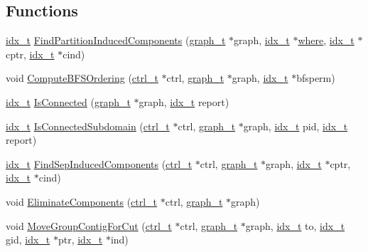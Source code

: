 \subsection*{Functions}
\begin{DoxyCompactItemize}
\item 
\hyperlink{a00876_aaa5262be3e700770163401acb0150f52}{idx\+\_\+t} \hyperlink{a00188_a9fe01ab71e17df2db81db0ce0376cc96}{Find\+Partition\+Induced\+Components} (\hyperlink{a00734}{graph\+\_\+t} $\ast$graph, \hyperlink{a00876_aaa5262be3e700770163401acb0150f52}{idx\+\_\+t} $\ast$\hyperlink{a00879_a7a355801f721e9d8d4ae03590a3a56b0}{where}, \hyperlink{a00876_aaa5262be3e700770163401acb0150f52}{idx\+\_\+t} $\ast$cptr, \hyperlink{a00876_aaa5262be3e700770163401acb0150f52}{idx\+\_\+t} $\ast$cind)
\item 
void \hyperlink{a00188_a5a549d240e59b4a6dedd991e0c4e82c1}{Compute\+B\+F\+S\+Ordering} (\hyperlink{a00742}{ctrl\+\_\+t} $\ast$ctrl, \hyperlink{a00734}{graph\+\_\+t} $\ast$graph, \hyperlink{a00876_aaa5262be3e700770163401acb0150f52}{idx\+\_\+t} $\ast$bfsperm)
\item 
\hyperlink{a00876_aaa5262be3e700770163401acb0150f52}{idx\+\_\+t} \hyperlink{a00188_a06638e74c8e49f9fb9881b960f8c4f05}{Is\+Connected} (\hyperlink{a00734}{graph\+\_\+t} $\ast$graph, \hyperlink{a00876_aaa5262be3e700770163401acb0150f52}{idx\+\_\+t} report)
\item 
\hyperlink{a00876_aaa5262be3e700770163401acb0150f52}{idx\+\_\+t} \hyperlink{a00188_aa6e8cf71404dada70fbba7451df92acb}{Is\+Connected\+Subdomain} (\hyperlink{a00742}{ctrl\+\_\+t} $\ast$ctrl, \hyperlink{a00734}{graph\+\_\+t} $\ast$graph, \hyperlink{a00876_aaa5262be3e700770163401acb0150f52}{idx\+\_\+t} pid, \hyperlink{a00876_aaa5262be3e700770163401acb0150f52}{idx\+\_\+t} report)
\item 
\hyperlink{a00876_aaa5262be3e700770163401acb0150f52}{idx\+\_\+t} \hyperlink{a00188_a47a30c466b82022d1c12f2aac5653223}{Find\+Sep\+Induced\+Components} (\hyperlink{a00742}{ctrl\+\_\+t} $\ast$ctrl, \hyperlink{a00734}{graph\+\_\+t} $\ast$graph, \hyperlink{a00876_aaa5262be3e700770163401acb0150f52}{idx\+\_\+t} $\ast$cptr, \hyperlink{a00876_aaa5262be3e700770163401acb0150f52}{idx\+\_\+t} $\ast$cind)
\item 
void \hyperlink{a00188_a002ad59e8624946cc9450cb9b3c10741}{Eliminate\+Components} (\hyperlink{a00742}{ctrl\+\_\+t} $\ast$ctrl, \hyperlink{a00734}{graph\+\_\+t} $\ast$graph)
\item 
void \hyperlink{a00188_a59be93c110982dd4b4e918957804e3b7}{Move\+Group\+Contig\+For\+Cut} (\hyperlink{a00742}{ctrl\+\_\+t} $\ast$ctrl, \hyperlink{a00734}{graph\+\_\+t} $\ast$graph, \hyperlink{a00876_aaa5262be3e700770163401acb0150f52}{idx\+\_\+t} to, \hyperlink{a00876_aaa5262be3e700770163401acb0150f52}{idx\+\_\+t} gid, \hyperlink{a00876_aaa5262be3e700770163401acb0150f52}{idx\+\_\+t} $\ast$ptr, \hyperlink{a00876_aaa5262be3e700770163401acb0150f52}{idx\+\_\+t} $\ast$ind)

\end{DoxyCompactItemize}
